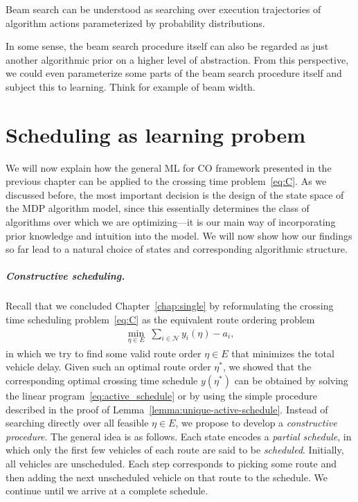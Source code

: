 \documentclass[a4paper]{report}
\theoremstyle{definition}
\theoremstyle{plain}
\newcommand\note[1]{{\color{Navy}\noindent#1}}
\newcommand\smallnote[1]{{\color{Navy}\noindent\scriptsize#1}}
\begin{document}
\note{
Beam search can be understood as searching over execution trajectories of
algorithm actions parameterized by probability distributions.
}

\smallnote{%
In some sense, the beam search procedure itself can also be regarded as just
another algorithmic prior on a higher level of abstraction.
%
From this perspective, we could even parameterize some parts of the beam search
procedure itself and subject this to learning. Think for example of beam width.
}


\clearpage

\chapter{Scheduling as learning probem}\label{chap:single-learning}

We will now explain how the general ML for CO framework presented in the
previous chapter can be applied to the crossing time problem~\eqref{eq:C}.
%
As we discussed before, the most important decision is the design of the state
space of the MDP algorithm model, since this essentially determines the class of
algorithms over which we are optimizing---it is our main way of incorporating
prior knowledge and intuition into the model.
%
We will now show how our findings so far lead
to a natural choice of states and corresponding algorithmic structure.

\paragraph{Constructive scheduling.}
Recall that we concluded Chapter~\ref{chap:single} by reformulating the crossing time
scheduling problem~\eqref{eq:C} as the equivalent route ordering problem
\begin{align}
  \label{eq:D-repeat}\tag{D}
  \min_{\eta \in E} \; \sum_{i \in \mathcal{N}} y_i(\eta) - a_i ,
\end{align}
in which we try to find some valid route order $\eta \in E$ that minimizes the total
vehicle delay.
%
Given such an optimal route order $\eta^*$, we showed that the corresponding
optimal crossing time schedule $y(\eta^*)$ can be obtained by solving the linear
program~\eqref{eq:active_schedule} or by using the simple procedure described in the proof of
Lemma~\ref{lemma:unique-active-schedule}.
%
Instead of searching directly over all feasible $\eta \in E$, we propose to develop a
\emph{constructive procedure}.
The general idea is as follows.
%
Each state encodes a \emph{partial schedule}, in which only the first few
vehicles of each route are said to be \emph{scheduled}.
%
Initially, all vehicles are unscheduled.
%
Each step corresponds to picking some route and then adding the next unscheduled
vehicle on that route to the schedule.
%
We continue until we arrive at a complete schedule.
\end{document}
